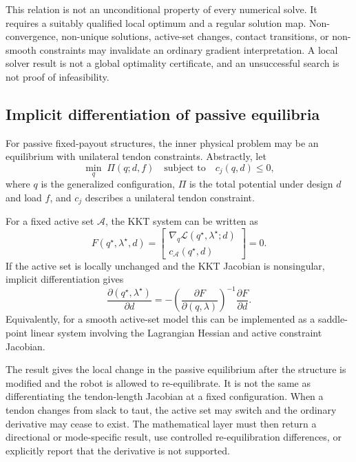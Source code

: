 This relation is not an unconditional property of every numerical solve. It requires a suitably qualified local optimum and a regular solution map. Non-convergence, non-unique solutions, active-set changes, contact transitions, or non-smooth constraints may invalidate an ordinary gradient interpretation. A local solver result is not a global optimality certificate, and an unsuccessful search is not proof of infeasibility.

\subsection{Implicit differentiation of passive equilibria}

For passive fixed-payout structures, the inner physical problem may be an equilibrium with unilateral tendon constraints. Abstractly, let
\begin{equation}
\min_q\;\Pi(q;d,f)
\quad\text{subject to}\quad
c_j(q,d)\leq0,
\label{eq:passive-equilibrium}
\end{equation}
where $q$ is the generalized configuration, $\Pi$ is the total potential under design $d$ and load $f$, and $c_j$ describes a unilateral tendon constraint.

For a fixed active set $\mathcal A$, the KKT system can be written as
\begin{equation}
F(q^\star,\lambda^\star,d)=
\begin{bmatrix}
\nabla_q\mathcal L(q^\star,\lambda^\star;d)\\
c_{\mathcal A}(q^\star,d)
\end{bmatrix}
=0.
\end{equation}
If the active set is locally unchanged and the KKT Jacobian is nonsingular, implicit differentiation gives
\begin{equation}
\frac{\partial(q^\star,\lambda^\star)}{\partial d}
=
-
\left(\frac{\partial F}{\partial(q,\lambda)}\right)^{-1}
\frac{\partial F}{\partial d}.
\label{eq:implicit-equilibrium}
\end{equation}
Equivalently, for a smooth active-set model this can be implemented as a saddle-point linear system involving the Lagrangian Hessian and active constraint Jacobian.

The result gives the local change in the passive equilibrium after the structure is modified and the robot is allowed to re-equilibrate. It is not the same as differentiating the tendon-length Jacobian at a fixed configuration. When a tendon changes from slack to taut, the active set may switch and the ordinary derivative may cease to exist. The mathematical layer must then return a directional or mode-specific result, use controlled re-equilibration differences, or explicitly report that the derivative is not supported.


